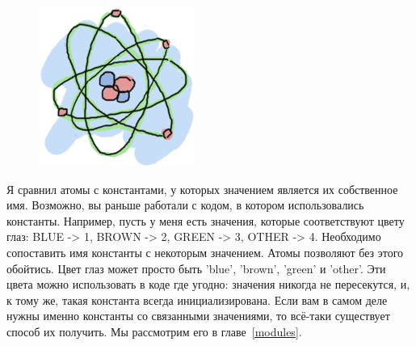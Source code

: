\documentclass[a4paper,12pt]{report}
\newcommand{\ops}{\colorbox{lgreen}}
\begin{document}
\begin{figure}
    \includegraphics[width=1\linewidth]{atom.png}
\end{figure}
Я сравнил атомы с константами, у которых значением является их собственное имя. Возможно, вы раньше работали с кодом, в котором использовались константы. Например, пусть у меня есть значения, которые соответствуют цвету глаз: \ops{BLUE -> 1, BROWN -> 2,} \ops{GREEN -> 3, OTHER -> 4}. Необходимо сопоставить имя константы с некоторым значением. Атомы позволяют без этого обойтись. Цвет глаз может просто быть 'blue', 'brown', 'green' и 'other'. Эти цвета можно использовать в коде где угодно: значения никогда не пересекутся, и, к тому же, такая константа всегда инициализирована. Если вам в самом деле нужны именно константы со связанными значениями, то всё\--таки существует способ их получить. Мы рассмотрим его в главе~\ref{modules}.
\end{document}
